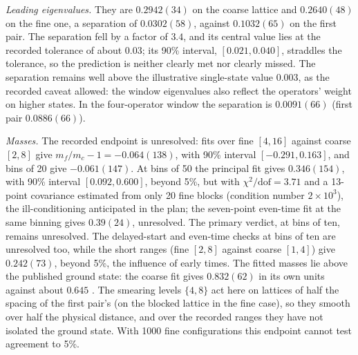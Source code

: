 \documentclass[11pt]{article}
\begin{document}
\emph{Leading eigenvalues.} They are $0.2942(34)$ on the coarse lattice and $0.2640(48)$ on the fine one, a
separation of $0.0302(58)$, against $0.1032(65)$ on the first pair. The separation fell by a factor of
$3.4$, and its central value lies at the recorded tolerance of about $0.03$; its 90\% interval,
$[0.021,0.040]$, straddles the tolerance, so the prediction is neither clearly met nor clearly missed. The
separation remains well above the illustrative single-state value $0.003$, as the recorded caveat allowed:
the window eigenvalues also reflect the operators' weight on higher states. In the four-operator window
the separation is $0.0091(66)$ (first pair $0.0886(66)$).

\emph{Masses.} The recorded endpoint is unresolved: fits over fine $[4,16]$ against coarse $[2,8]$ give
$m_f/m_c-1=-0.064(138)$, with 90\% interval $[-0.291,0.163]$, and bins of 20 give $-0.061(147)$. At bins of
50 the principal fit gives $0.346(154)$, with 90\% interval $[0.092,0.600]$, beyond 5\%, but with
$\chi^2/\mathrm{dof}=3.71$ and a 13-point covariance estimated from only 20 fine blocks (condition number
$2\times10^3$), the ill-conditioning anticipated in the plan; the seven-point even-time fit at the same
binning gives $0.39(24)$, unresolved. The primary verdict, at bins of ten, remains unresolved. The
delayed-start and even-time checks at bins of ten are unresolved too, while the short ranges (fine
$[2,8]$ against coarse $[1,4]$) give $0.242(73)$, beyond 5\%, the influence of early times. The fitted
masses lie above the published ground state: the coarse fit gives $0.832(62)$ in its own units against
about $0.645$ \cite{AthenodorouTeper2020}. The smearing levels $\{4,8\}$ act here on lattices of half the
spacing of the first pair's (on the blocked lattice in the fine case), so they smooth over half the
physical distance, and over the recorded ranges they have not isolated the ground state. With 1000 fine
configurations this endpoint cannot test agreement to 5\%.
\end{document}
